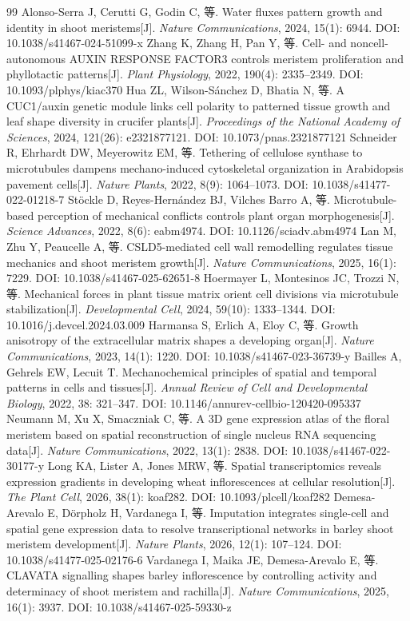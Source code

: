 \documentclass[11pt,a4paper]{ctexart}
\begin{document}
\begin{thebibliography}{99}
 Alonso-Serra J, Cerutti G, Godin C, 等. Water fluxes pattern growth and identity in shoot meristems[J]. \textit{Nature Communications}, 2024, 15(1): 6944. DOI: 10.1038/s41467-024-51099-x
 Zhang K, Zhang H, Pan Y, 等. Cell- and noncell-autonomous AUXIN RESPONSE FACTOR3 controls meristem proliferation and phyllotactic patterns[J]. \textit{Plant Physiology}, 2022, 190(4): 2335–2349. DOI: 10.1093/plphys/kiac370
 Hua ZL, Wilson-Sánchez D, Bhatia N, 等. A CUC1/auxin genetic module links cell polarity to patterned tissue growth and leaf shape diversity in crucifer plants[J]. \textit{Proceedings of the National Academy of Sciences}, 2024, 121(26): e2321877121. DOI: 10.1073/pnas.2321877121
 Schneider R, Ehrhardt DW, Meyerowitz EM, 等. Tethering of cellulose synthase to microtubules dampens mechano-induced cytoskeletal organization in Arabidopsis pavement cells[J]. \textit{Nature Plants}, 2022, 8(9): 1064–1073. DOI: 10.1038/s41477-022-01218-7
 Stöckle D, Reyes-Hernández BJ, Vilches Barro A, 等. Microtubule-based perception of mechanical conflicts controls plant organ morphogenesis[J]. \textit{Science Advances}, 2022, 8(6): eabm4974. DOI: 10.1126/sciadv.abm4974
 Lan M, Zhu Y, Peaucelle A, 等. CSLD5-mediated cell wall remodelling regulates tissue mechanics and shoot meristem growth[J]. \textit{Nature Communications}, 2025, 16(1): 7229. DOI: 10.1038/s41467-025-62651-8
 Hoermayer L, Montesinos JC, Trozzi N, 等. Mechanical forces in plant tissue matrix orient cell divisions via microtubule stabilization[J]. \textit{Developmental Cell}, 2024, 59(10): 1333–1344. DOI: 10.1016/j.devcel.2024.03.009
 Harmansa S, Erlich A, Eloy C, 等. Growth anisotropy of the extracellular matrix shapes a developing organ[J]. \textit{Nature Communications}, 2023, 14(1): 1220. DOI: 10.1038/s41467-023-36739-y
 Bailles A, Gehrels EW, Lecuit T. Mechanochemical principles of spatial and temporal patterns in cells and tissues[J]. \textit{Annual Review of Cell and Developmental Biology}, 2022, 38: 321–347. DOI: 10.1146/annurev-cellbio-120420-095337
 Neumann M, Xu X, Smaczniak C, 等. A 3D gene expression atlas of the floral meristem based on spatial reconstruction of single nucleus RNA sequencing data[J]. \textit{Nature Communications}, 2022, 13(1): 2838. DOI: 10.1038/s41467-022-30177-y
 Long KA, Lister A, Jones MRW, 等. Spatial transcriptomics reveals expression gradients in developing wheat inflorescences at cellular resolution[J]. \textit{The Plant Cell}, 2026, 38(1): koaf282. DOI: 10.1093/plcell/koaf282
 Demesa-Arevalo E, Dörpholz H, Vardanega I, 等. Imputation integrates single-cell and spatial gene expression data to resolve transcriptional networks in barley shoot meristem development[J]. \textit{Nature Plants}, 2026, 12(1): 107–124. DOI: 10.1038/s41477-025-02176-6
 Vardanega I, Maika JE, Demesa-Arevalo E, 等. CLAVATA signalling shapes barley inflorescence by controlling activity and determinacy of shoot meristem and rachilla[J]. \textit{Nature Communications}, 2025, 16(1): 3937. DOI: 10.1038/s41467-025-59330-z
\end{thebibliography}
\end{document}
